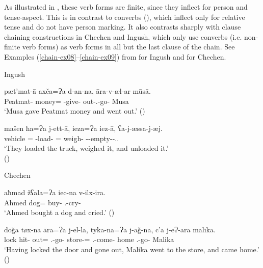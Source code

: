 As illustrated in , these verb forms are finite, since they inflect for person and tense-aspect. This is in contrast to converbs (), which inflect only for relative tense and do not have person marking. It also contrasts sharply with clause chaining constructions in Chechen and Ingush, which only use converbs (i.e. non-finite verb forms) as verb forms in all but the last clause of the chain. See Examples (\ref{chain-ex08}--\ref{chain-ex09}) from \textcite[531--540]{nichols11} for Ingush and \textcite{good} for Chechen.\pagebreak


\begin{exe}
	\ex Ingush\label{chain-ex08}
	\begin{xlist}
			\ex\label{chain-ex08a}
			\gll pæt'mat-ā axča=Ɂa d-an-na, āra-v-æl-ar mūsā. \\
			Peatmat-{\Dat} money={\Add} {\D}-give-{\Ante} out-{\M}.{\Sg}-go-{\Pst} Musa \\
			\trans `Musa gave Peatmat money and went out.'
			\hfill (\cite[535]{nichols11})
		
		
		
			\ex\label{chain-ex08b}
			\gll mašen ħa=Ɂa j-ett-ā, ieza=Ɂa iez-ā, ʕa-j-æssa-j-æj. \\
			vehicle {\Pv}={\Add} {\J}-load-{\Ante} {\Redupl}={\Add} weigh-{\Ante} {\Pv}-{\J}-empty-{\J}-{\Tr}.{\Nw}.{\J} \\
			\trans `They loaded the truck, weighed it, and unloaded it.' \\
			\hfill (\cite[535]{nichols11})
		
		
	\end{xlist}

	\ex Chechen\label{chain-ex09}
	\begin{xlist}
			\ex\label{chain-ex09a}
			\gll aħmad žʕala=Ɂa iec-na v-ilx-ira. \\
			Ahmed dog={\Add} buy-{\Ante} {\M}.{\Sg}-cry-{\Pst} \\
			\trans `Ahmed bought a dog and cried.'
			\hfill (\cite[125]{good})
		
		
		
			\ex\label{chain-ex09b}
			\gll dō\u{g}a tøx-na āra=Ɂa j-el-la, tyka-na=Ɂa j-a\u{g}-na, c'a j-eɁ-ara malīka. \\
			lock hit-{\Ante} out={\Add} {\F}.{\Sg}-go-{\Ante} store-{\Dat}={\Add} {\F}.{\Sg}-come-{\Ante} home {\F}.{\Sg}-go-{\Pst} Malika \\
			\trans  `Having locked the door and gone out, Malika went to the store, and came home.'
			\hfill (\cite[140]{good})
		
		
		
		
	\end{xlist}
\end{exe}


